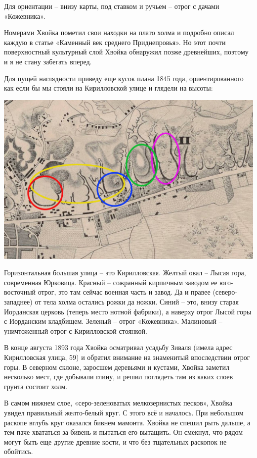 Для ориентации – внизу карты, под ставком и ручьем – отрог с дачами «Кожевника».

Номерами Хвойка пометил свои находки на плато холма и подробно описал каждую в статье «Каменный век среднего Приднепровья». Но этот почти поверхностный культурный слой Хвойка обнаружил позже древнейших, поэтому и я не стану забегать вперед.

Для пущей наглядности приведу еще кусок плана 1845 года, ориентированного как если бы мы стояли на Кирилловской улице и глядели на высоты:

\begin{center}
\includegraphics[width=\linewidth]{chast-kirvys/kirstoy/1845-vmap.jpg}
\end{center}

Горизонтальная большая улица – это Кирилловская. Желтый овал – Лысая гора, современная Юрковица. Красный – сожранный кирпичным заводом ее юго-восточ\-ный отрог, это там сейчас военная часть и завод. Да и правее (северо-западнее) от тела холма остались рожки да ножки. Синий – это, внизу старая Иорданская церковь (теперь место нотной фабрики), а наверху отрог Лысой горы с Иорданским кладбищем. Зеленый – отрог «Кожевника». Малиновый – уничтоженный отрог с Кирилловской стоянкой.

В конце августа 1893 года Хвойка осматривал усадьбу Зиваля (имела адрес Кирилловская улица, 59) и обратил внимание на знаменитый впоследствии отрог горы. В северном склоне, заросшем деревьями и кустами, Хвойка заметил несколько мест, где добывали глину, и решил поглядеть там из каких слоев грунта состоит холм. 

В самом нижнем слое, «серо-зеленоватых мелкозернистых песков», Хвойка увидел правильный желто-белый круг. С этого всё и началось. При небольшом раскопе вглубь круг оказался бивнем мамонта. Хвойка не спешил рыть дальше, а тем паче хвататься за бивень и пытаться его вытащить. Он смекнул, что рядом могут быть еще другие древние кости, и что без тщательных раскопок не обойтись.

